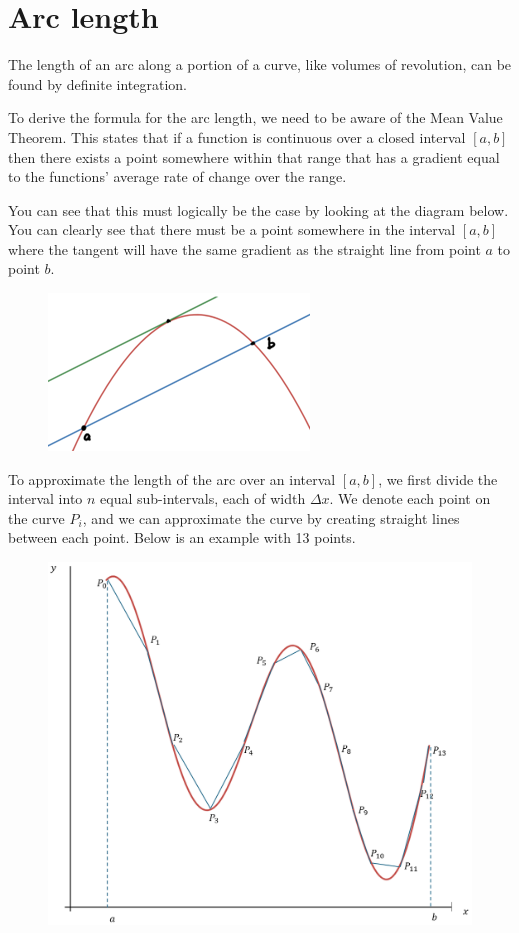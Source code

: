 \documentclass[../main.tex]{subfiles}
\begin{document}
\section{Arc length}
The length of an arc along a portion of a curve, like volumes of revolution, can be found by definite integration.

To derive the formula for the arc length, we need to be aware of the Mean Value Theorem. This states that if a function is continuous over a closed interval $[a, b]$ then there exists a point somewhere within that range that has a gradient equal to the functions' average rate of change over the range.

You can see that this must logically be the case by looking at the diagram below. You can clearly see that there must be a point somewhere in the interval $[a,b]$ where the tangent will have the same gradient as the straight line from point $a$ to point $b$.

\begin{figure}[h]
    \centering
    \includegraphics[width=0.3\linewidth]{images/arclength1.png}
\end{figure}

To approximate the length of the arc over an interval $[a,b]$, we first divide the interval into $n$ equal sub-intervals, each of width $\Delta x$. We denote each point on the curve $P_i$, and we can approximate the curve by creating straight lines between each point. Below is an example with 13 points.

\begin{figure}[h]
    \centering
    \includegraphics[width=0.6\linewidth]{images/arclength5.png}
\end{figure}
\end{document}
